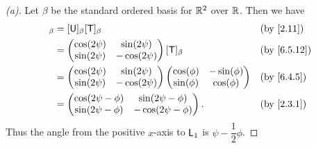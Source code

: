 \begin{proof}[(a)]
  Let \(\beta\) be the standard ordered basis for \(\mathbb{R}^2\) over \(\mathbb{R}\).
  Then we have
  \begin{align*}
    [\U \T]_{\beta} & = [\U]_{\beta} [\T]_{\beta}                   &  & \by{2.11} \\
                    & = \begin{pmatrix}
                          \cos(2 \psi) & \sin(2 \psi)  \\
                          \sin(2 \psi) & -\cos(2 \psi)
                        \end{pmatrix} [\T]_{\beta}               &  & \by{6.5.12}  \\
                    & = \begin{pmatrix}
                          \cos(2 \psi) & \sin(2 \psi)  \\
                          \sin(2 \psi) & -\cos(2 \psi)
                        \end{pmatrix} \begin{pmatrix}
                                        \cos(\phi) & -\sin(\phi) \\
                                        \sin(\phi) & \cos(\phi)
                                      \end{pmatrix}               &  & \by{6.4.5}  \\
                    & = \begin{pmatrix}
                          \cos(2 \psi - \phi) & \sin(2 \psi - \phi)  \\
                          \sin(2 \psi - \phi) & -\cos(2 \psi - \phi)
                        \end{pmatrix}. &  & \by{2.3.1}
  \end{align*}
  Thus the angle from the positive \(x\)-axis to \(\mathsf{L}_1\) is \(\psi - \dfrac{1}{2} \phi\).
\end{proof}

